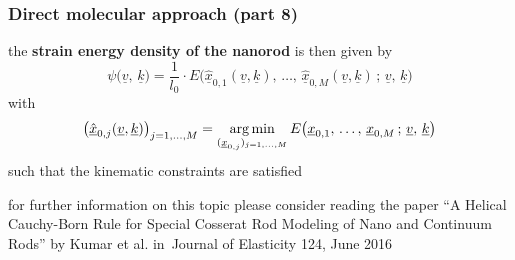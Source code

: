 \begin{frame}
  \frametitle{Direct molecular approach (part 8)}

  the \textbf{strain energy density of the nanorod} is then given by
  \begin{displaymath}
    \psi \bigl( \underline{v}, \, \underline{k} \bigr) =
    \frac{1}{l_0} \cdot E \bigl( \underline{\hat{x}}_{0,1}(\underline{v},\underline{k}), \, \dots, \, \underline{\hat{x}}_{0,M}(\underline{v},\underline{k}) \, ; \, \underline{v}, \, \underline{k} \bigr)
  \end{displaymath}
  with
  \begin{displaymath}
    \bigl( \underline{\hat{x}}_{0,j}(\underline{v},\underline{k}) \bigr)_{j=1,\dots,M}= \operatorname*{\arg \min}_{(\underline{x}_{0,j})_{j=1,\dots,M}} E \bigl( \underline{x}_{0,1}, \, \dots , \, \underline{x}_{0,M} \, ; \, \underline{v}, \, \underline{k} \bigr)
  \end{displaymath}
  such that the kinematic constraints are satisfied
  
  \vspace{1em}
  for further information on this topic please consider reading the paper ``A Helical Cauchy-Born Rule for Special Cosserat Rod Modeling of Nano and Continuum Rods'' by Kumar et al. in Journal of Elasticity 124, June 2016
  
\end{frame}
